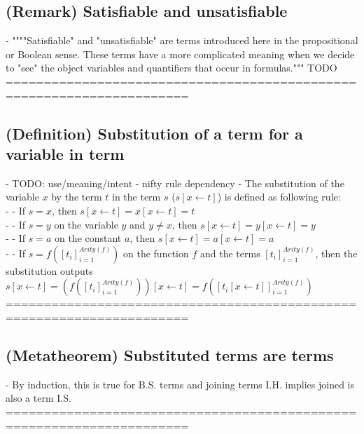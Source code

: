 \documentclass{article}
\begin{document}
\subsection{(Remark) Satisfiable and unsatisfiable}
	- """"Satisfiable" and "unsatisfiable" are terms introduced here in the propositional or Boolean sense. These terms have a more complicated meaning when we decide to "see" the object variables and quantifiers that occur in formulas.""" TODO
	======================================================================
\subsection{(Definition) Substitution of a term for a variable in term}
	- TODO: use/meaning/intent - nifty rule dependency
	- The substitution of the variable $x$ by the term $t$ in the term $s$ ($s[x \leftarrow t]$) is defined as following rule: \\
		- - If $s = x$, then $s[x \leftarrow t] = x[x \leftarrow t] = t$ \\
		- - If $s = y$ on the variable $y$ and $y \neq x$, then $s[x \leftarrow t] = y[x \leftarrow t] = y$ \\
		- - If $s = a$ on the constant $a$, then $s[x \leftarrow t] = a[x \leftarrow t] = a$ \\
		- - If $s = f([t_i]_{i=1}^{Arity(f)})$ on the function $f$ and the terms $[t_i]_{i=1}^{Arity(f)}$, then the substitution outputs $s[x \leftarrow t] = (f([t_i]_{i=1}^{Arity(f)}))[x \leftarrow t] = f([t_i[x \leftarrow t]]_{i=1}^{Arity(f)})$ \\
	======================================================================
\subsection{(Metatheorem) Substituted terms are terms}
	- By induction, this is true for B.S. terms and joining terms I.H. implies joined is also a term I.S. \\
	======================================================================
\end{document}
